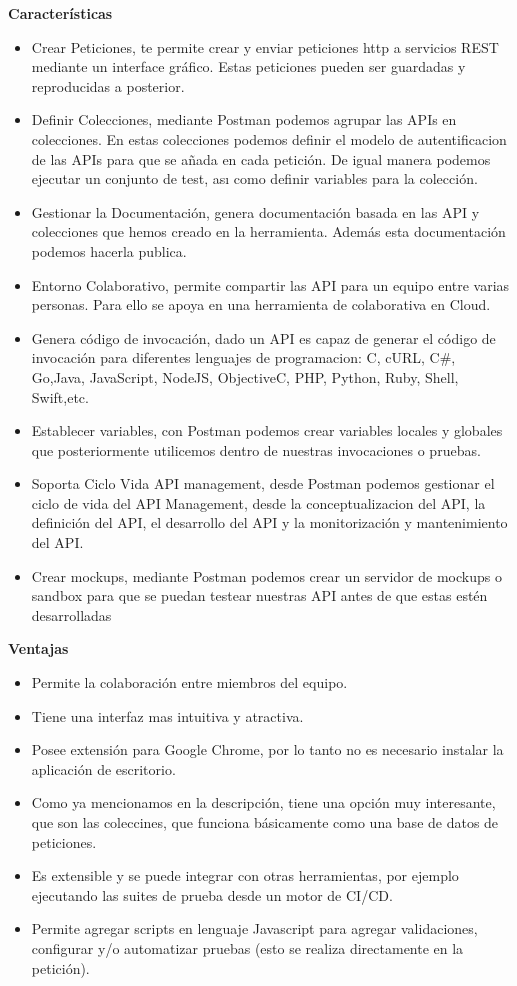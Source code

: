 \documentclass{article}
\begin{document}
\begin{multicols}{2}
\textbf{Características}
\begin{itemize}
\item Crear Peticiones, te permite crear y enviar peticiones http a servicios REST mediante un interface
gráfico. Estas peticiones pueden ser guardadas y reproducidas a posterior.
\item Definir Colecciones, mediante Postman podemos
agrupar las APIs en colecciones. En estas colecciones podemos definir el modelo de autentificacion
de las APIs para que se añada en cada petición. De 
igual manera podemos ejecutar un conjunto de test,
ası como definir variables para la colección. 
\item Gestionar la Documentación, genera documentación basada en las API y colecciones que 
hemos creado en la herramienta. Además esta documentación podemos hacerla publica.
\item Entorno Colaborativo, permite compartir las API
para un equipo entre varias personas. Para ello se apoya en una herramienta de colaborativa en Cloud.
\item Genera código de invocación, dado un API es capaz de generar el código de invocación para diferentes lenguajes de programacion: C, cURL, C#, Go,Java, JavaScript, NodeJS, ObjectiveC, PHP, Python, Ruby, Shell, Swift,etc.
\item Establecer variables, con Postman podemos crear variables locales y globales que posteriormente utilicemos dentro de nuestras invocaciones o pruebas.
\item Soporta Ciclo Vida API management, desde Postman podemos gestionar el ciclo de vida del API Management, desde la conceptualizacion del API, la definición del API, el desarrollo del API y la monitorización y mantenimiento del API. 
\item Crear mockups, mediante Postman podemos crear un servidor de mockups o sandbox para que se puedan testear nuestras API antes de que estas estén desarrolladas
\end{itemize}

\textbf{Ventajas}

\begin{itemize}
 \item Permite la colaboración entre miembros del equipo.
 \item Tiene una interfaz mas intuitiva y atractiva. 
 \item Posee extensión para Google Chrome, por lo 
tanto no es necesario instalar la aplicación de 
escritorio.
 \item Como ya mencionamos en la descripción, tiene 
una opción muy interesante, que son las coleccines, que funciona básicamente como una
base de datos de peticiones.
 \item Es extensible y se puede integrar con otras herramientas, por ejemplo ejecutando las suites de
prueba desde un motor de CI/CD.
 \item Permite agregar scripts en lenguaje Javascript
para agregar validaciones, configurar y/o automatizar pruebas (esto se realiza directamente
en la petición).
\end{itemize}


\end{multicols}
\end{document}
